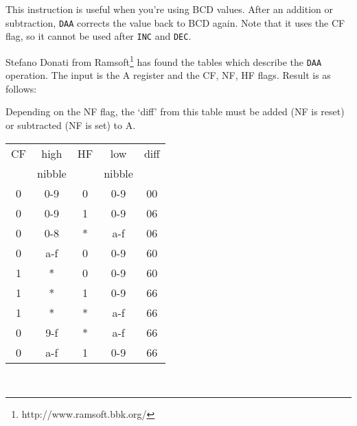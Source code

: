 \documentclass[twoside,openright,a4paper]{book}
\begin{document}
This instruction is useful when you're using BCD values. After an addition or subtraction, {\tt DAA} corrects the value back to BCD again.  Note that it uses the CF flag, so it cannot be used after {\tt INC} and {\tt DEC}.

Stefano Donati from Ramsoft\footnote{http://www.ramsoft.bbk.org/} has found the tables which describe the {\tt DAA} operation. The input is the A register and the CF, NF, HF flags. Result is as follows:

Depending on the NF flag, the `diff' from this table must be added (NF is reset) or subtracted (NF is set) to A.

 
\begin{tabular}{c|c|c|c|c}
	CF &  high   & HF & low    & diff \\
	&  nibble &    & nibble &      \\
	\hline
	0 & 0-9     &  0 & 0-9    &  00  \\
	0 & 0-9     &  1 & 0-9    &  06  \\
	0 & 0-8     &  * & a-f    &  06  \\
	0 & a-f     &  0 & 0-9    &  60  \\
	1 &  *      &  0 & 0-9    &  60  \\
	1 &  *      &  1 & 0-9    &  66  \\
	1 &  *      &  * & a-f    &  66  \\
	0 & 9-f     &  * & a-f    &  66  \\
	0 & a-f     &  1 & 0-9    &  66  \\
	\hline
\end{tabular}\\[1ex]
\end{document}
